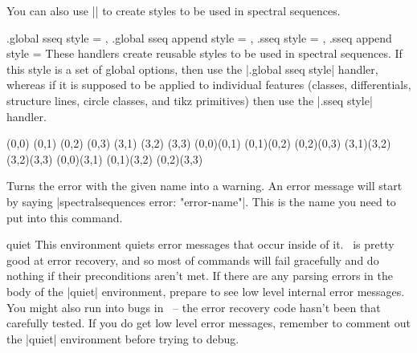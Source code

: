 \begin{sseqdata}[name = basic, cohomological Serre grading]
\begin{command}{\sseqset{}}
You can also use |\sseqset| to create styles to be used in spectral sequences.
\begin{keylist}{
    .global sseq style = ,
    .global sseq append style = ,
    .sseq style = ,
    .sseq append style = 
}%
These handlers create reusable styles to be used in spectral sequences. If this
style is a set of global options, then use the |.global sseq style| handler,
whereas if it is supposed to be applied to individual features (classes,
differentials, structure lines, circle classes, and tikz primitives) then use
the |.sseq style| handler.
\begin{codeexample}[width=6cm]
\begin{sseqpage}[ mysseq ]
\class(0,0) \class(0,1) \class(0,2) \class(0,3)
\class(3,1) \class(3,2) \class(3,3)
\structline(0,0)(0,1) \structline(0,1)(0,2)
\structline(0,2)(0,3)
\structline(3,1)(3,2) \structline(3,2)(3,3)
\structline[htwostruct](0,0)(3,1)
\structline[htwostruct](0,1)(3,2)
\structline[htwostruct](0,2)(3,3)
\end{sseqpage}
\end{codeexample}
\end{keylist}
\end{command}

\begin{command}{\SseqErrorToWarning{}}%
Turns the error with the given name into a warning. An error message will start
by saying \let\eatclnifpresent\empty|spectralsequences error: "error-name"|.
This is the name you need to put into this command.
\end{command}

\begin{environment}{{quiet}}%
This environment quiets error messages that occur inside of it. \sseqpages\ is
pretty good at error recovery, and so most of commands will fail gracefully and
do nothing if their preconditions aren't met. If there are any parsing errors in
the body of the |{quiet}| environment, prepare to see low level internal error
messages. You might also run into bugs in \sseqpages\ -- the error recovery code
hasn't been that carefully tested. If you do get low level error messages,
remember to comment out the |{quiet}| environment before trying to debug.


\end{environment}
\end{sseqdata}
